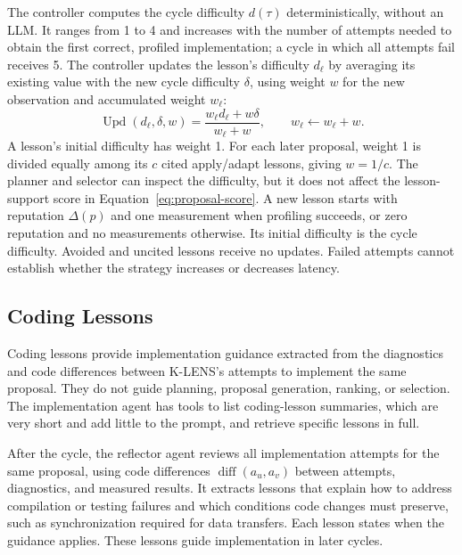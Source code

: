 \documentclass[acmsmall,screen,review,anonymous,nonacm]{acmart}
\newcommand{\klens}{\textsc{K-LENS}\xspace}
\begin{document}
The controller computes the cycle difficulty $d(\tau)$ deterministically, without
an LLM. It ranges from 1 to 4 and increases with the number of attempts needed
to obtain the first correct, profiled implementation; a cycle in which all attempts fail
receives 5. The controller updates the lesson's difficulty
$d_\ell$ by averaging its existing value with the new cycle difficulty $\delta$,
using weight $w$ for the new observation and accumulated weight $w_\ell$:
\begin{equation}
 \operatorname{Upd}(d_\ell,\delta,w)=\frac{w_\ell d_\ell+w\delta}{w_\ell+w},
 \qquad w_\ell\leftarrow w_\ell+w.
 \label{eq:difficulty-update}
\end{equation}
A lesson's initial difficulty has weight 1. For each later proposal, weight 1
is divided equally among its $c$ cited apply/adapt lessons, giving $w=1/c$.
The planner and selector can inspect the difficulty, but it does not
affect the lesson-support score in Equation~\ref{eq:proposal-score}.
A new lesson starts with reputation $\Delta(p)$ and one measurement when profiling
succeeds, or zero reputation and no measurements otherwise. Its initial difficulty
is the cycle difficulty. Avoided and uncited lessons receive no updates. Failed attempts cannot establish whether the strategy
increases or decreases latency. 

\subsection{Coding Lessons}
\label{sec:coding-lessons}

Coding lessons provide implementation guidance extracted from
the diagnostics and code differences between \klens's attempts to
implement the same proposal. They do not guide planning, proposal
generation, ranking, or selection.
The implementation agent has tools to list coding-lesson
summaries, which are very short and add little to the prompt, and retrieve
specific lessons in full. 

After the cycle, the reflector agent reviews all implementation attempts
  for the same proposal, using code differences
  $\operatorname{diff}(a_u,a_v)$ between attempts, diagnostics,
  and measured results. It extracts lessons that explain how to address
  compilation or testing failures and which conditions code changes must
  preserve, such as synchronization required for data transfers. Each lesson
  states when the guidance applies. These lessons guide implementation in later cycles.
\end{document}
